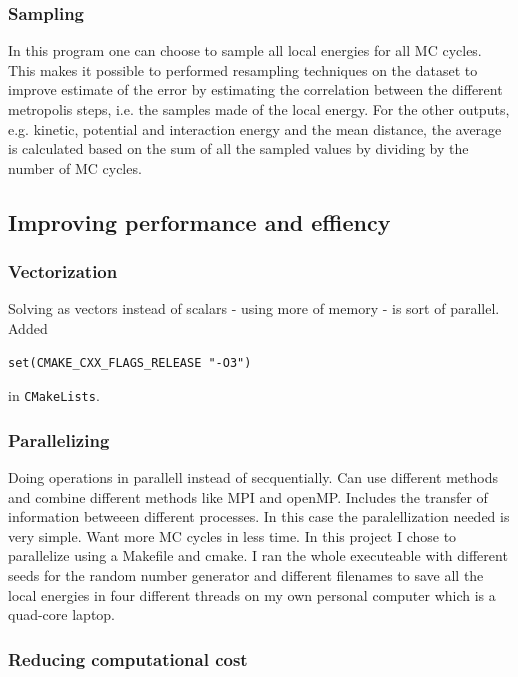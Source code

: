 \subsubsection{Sampling}

In this program one can choose to sample all local energies for all MC cycles. This makes it possible to performed resampling techniques on the dataset to improve estimate of the error by estimating the correlation between the different metropolis steps, i.e. the samples made of the local energy. For the other outputs, e.g. kinetic, potential and interaction energy and the mean distance, the average is calculated based on the sum of all the sampled values by dividing by the number of MC cycles.

\subsection{Improving performance and effiency}

\subsubsection{Vectorization}

Solving as vectors instead of scalars - using more of memory - is sort of parallel. Added

\begin{lstlisting}
set(CMAKE_CXX_FLAGS_RELEASE "-O3")
\end{lstlisting}

in \texttt{CMakeLists}.

\subsubsection{Parallelizing}

Doing operations in parallell instead of secquentially. Can use different methods and combine different methods like MPI and openMP. Includes the transfer of information betweeen different processes. In this case the paralellization needed is very simple. Want more MC cycles in less time. In this project I chose to parallelize using a Makefile and cmake. I ran the whole executeable with different seeds for the random number generator and different filenames to save all the local energies in four different threads on my own personal computer which is a quad-core laptop.

\subsubsection{Reducing computational cost}


